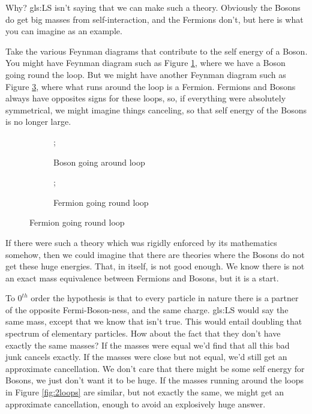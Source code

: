 \documentclass[]{article}
\begin{document}
Why? \gls{gls:LS} isn't saying that we can make such a theory. Obviously the Bosons do get big masses from self-interaction, and the Fermions don't, but here is what you can imagine as an example.    

Take the various Feynman diagrams that contribute to the self energy of a Boson. You might have Feynman diagram such as  Figure \ref{fig:2loops:bosons}, where we have a Boson going round the loop. But we might have another Feynman diagram such as Figure \ref{fig:2loops:fermions}, where what runs around the loop is a Fermion. Fermions and Bosons always have opposites signs for these loops, so, if everything were absolutely symmetrical, we might imagine things canceling, so that self energy of the Bosons is no longer large.

\begin{figure}[H]
	\caption{Some illustrative Feynman Diagrams for a Boson}\label{fig:2loops}
	\begin{subfigure}{0.45\textwidth}
		\begin{center}
			\caption{Boson going around loop}\label{fig:2loops:bosons}
			;
		\end{center}
	\end{subfigure}
	\hfill
	\begin{subfigure}{0.45\textwidth}
		\begin{center}
			\caption{Fermion going round loop}\label{fig:2loops:fermions}
			;
		\end{center}
	\end{subfigure}
\end{figure}

If there were such a theory which was rigidly enforced by its mathematics somehow, then we could imagine that there are theories where the Bosons do not get these huge energies. That, in itself, is not good enough. We know there is not an exact mass equivalence between  Fermions and Bosons, but it is a start.

To $0^{th}$ order the hypothesis is that to every particle in nature there is a partner of the opposite Fermi-Boson-ness, and the same charge. \gls{gls:LS} would say the same mass, except that we know that isn't true. This would entail doubling that spectrum of elementary particles. How about the fact that they don't have exactly the same masses? If the masses were equal we'd find that all this bad junk cancels exactly. If the masses were close but not equal, we'd still get an approximate cancellation. We don't care that there might be some self energy for Bosons, we just don't want it to be huge. If the masses running around the loops in Figure \ref{fig:2loops} are similar, but not exactly the same, we might get an approximate cancellation, enough to avoid an explosively huge answer.
\end{document}
